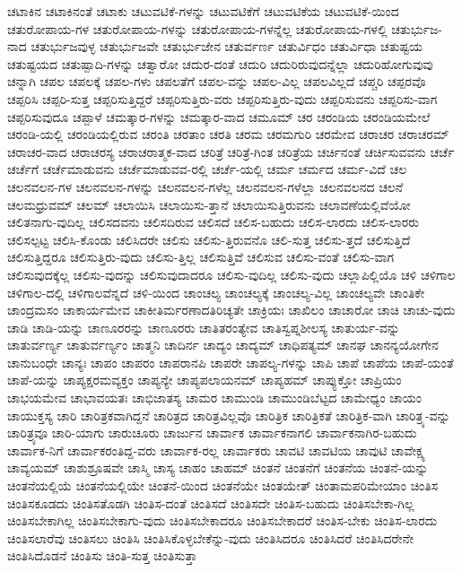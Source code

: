 {ಚಟಾಕಿನ
ಚಟಾಕಿನಂತೆ
ಚಟಾಕು
ಚಟುವಟಿಕೆ-ಗಳನ್ನು
ಚಟುವಟಿಕೆಗೆ
ಚಟುವಟಿಕೆಯ
ಚಟುವಟಿಕೆ-ಯಿಂದ
ಚತುರೋಪಾಯ-ಗಳ
ಚತುರೋಪಾಯ-ಗಳನ್ನು
ಚತುರೋಪಾಯ-ಗಳನ್ನೆಲ್ಲ
ಚತುರೋಪಾಯ-ಗಳಲ್ಲಿ
ಚತುರ್ಭುಜ-ನಾದ
ಚತುರ್ಭುಜವುಳ್ಳ
ಚತುರ್ಭುಜವೇ
ಚತುರ್ಭುಜೇನ
ಚತುರ್ವರ್ಣ
ಚತುರ್ವಿಧಂ
ಚತುರ್ವಿಧಾ
ಚತುಷ್ಟಯ
ಚತುಷ್ಟಯದ
ಚತುಷ್ಪಾದಿ-ಗಳನ್ನು
ಚತ್ವಾರೋ
ಚದುರ-ದಂತೆ
ಚದುರಿ
ಚದುರಿರುವುದನ್ನೆಲ್ಲಾ
ಚದುರಿಹೋಗುವುವು
ಚನ್ನಾಗಿ
ಚಪಲ
ಚಪಲಕ್ಕೆ
ಚಪಲ-ಗಳು
ಚಪಲತೆಗೆ
ಚಪಲ-ವನ್ನು
ಚಪಲ-ವಿಲ್ಲ
ಚಪಲವಿಲ್ಲದೆ
ಚಪ್ಚರಿ
ಚಪ್ಪರವೊ
ಚಪ್ಪರಿಸಿ
ಚಪ್ಪರಿ-ಸುತ್ತ
ಚಪ್ಪರಿಸುತ್ತಿದ್ದರೆ
ಚಪ್ಪರಿಸುತ್ತಿರು-ವರು
ಚಪ್ಪರಿಸುತ್ತಿರು-ವುದು
ಚಪ್ಪರಿಸುವನು
ಚಪ್ಪರಿಸು-ವಾಗ
ಚಪ್ಪರಿಸುವುದೂ
ಚಪ್ಪಾಳೆ
ಚಮತ್ಕಾರ-ಗಳನ್ನು
ಚಮತ್ಕಾರ-ವಾದ
ಚಮೂಮ್
ಚರ
ಚರಂಡಿಯ
ಚರಂಡಿಯಮೇಲೆ
ಚರಂಡಿ-ಯಲ್ಲಿ
ಚರಂಡಿಯಲ್ಲಿರುವ
ಚರಂತಿ
ಚರತಾಂ
ಚರತಿ
ಚರಮ
ಚರಮಗುರಿ
ಚರಮೇವ
ಚರಾಚರ
ಚರಾಚರಮ್
ಚರಾಚರ-ವಾದ
ಚರಾಚರಸ್ಯ
ಚರಾಚರಾತ್ಮಕ-ವಾದ
ಚರಿತ್ರೆ
ಚರಿತ್ರೆ-ಗಿಂತ
ಚರಿತ್ರೆಯ
ಚರ್ಚಿನಂತೆ
ಚರ್ಚಿಸುವವನು
ಚರ್ಚೆ
ಚರ್ಚೆಗೆ
ಚರ್ಚೆಮಾಡುವನು
ಚರ್ಚೆಮಾಡುವವ-ರಲ್ಲಿ
ಚರ್ಚೆ-ಯಲ್ಲಿ
ಚರ್ಮ
ಚರ್ಮದ
ಚರ್ಮ-ವಿದೆ
ಚಲ
ಚಲನವಲನ-ಗಳ
ಚಲನವಲನ-ಗಳನ್ನು
ಚಲನವಲನ-ಗಳೆಲ್ಲ
ಚಲನವಲನ-ಗಳೆಲ್ಲಾ
ಚಲನವಲನದ
ಚಲನೆ
ಚಲಮಧ್ರುವಮ್
ಚಲಮ್
ಚಲಾಯಿಸಿ
ಚಲಾಯಿಸು-ತ್ತಾನೆ
ಚಲಾಯಿಸುತ್ತಿರುವನು
ಚಲಾವಣೆಯಲ್ಲಿವೆಯೋ
ಚಲಿತನಾಗು-ವುದಿಲ್ಲ
ಚಲಿಸದವನು
ಚಲಿಸದಿರುವ
ಚಲಿಸದೆ
ಚಲಿಸ-ಬಹುದು
ಚಲಿಸ-ಲಾರದು
ಚಲಿಸ-ಲಾರರು
ಚಲಿಸಲ್ಪಟ್ಟ
ಚಲಿಸಿ-ಕೊಂಡು
ಚಲಿಸಿದರೇ
ಚಲಿಸು
ಚಲಿಸು-ತ್ತಿರುವನೊ
ಚಲಿ-ಸುತ್ತ
ಚಲಿಸು-ತ್ತದೆ
ಚಲಿಸುತ್ತಿದೆ
ಚಲಿಸುತ್ತಿದ್ದರೂ
ಚಲಿಸುತ್ತಿರು-ವುದು
ಚಲಿಸು-ತ್ತಿಲ್ಲ
ಚಲಿಸುತ್ತಿವೆ
ಚಲಿಸುವ
ಚಲಿಸು-ವಂತೆ
ಚಲಿಸು-ವಾಗ
ಚಲಿಸುವುದಕ್ಕೆಲ್ಲ
ಚಲಿಸು-ವುದನ್ನು
ಚಲಿಸುವುದಾದರೂ
ಚಲಿಸು-ವುದಿಲ್ಲ
ಚಲಿಸು-ವುದು
ಚಲ್ಲಾಪಿಲ್ಲಿಯೊ
ಚಳಿ
ಚಳಿಗಾಲ
ಚಳಿಗಾಲ-ದಲ್ಲಿ
ಚಳಿಗಾಲವೆನ್ನದೆ
ಚಳಿ-ಯಿಂದ
ಚಾಂಚಲ್ಯ
ಚಾಂಚಲ್ಯಕ್ಕೆ
ಚಾಂಚಲ್ಯ-ವಿಲ್ಲ
ಚಾಂಚಲ್ಯವೇ
ಚಾಂತಿಕೇ
ಚಾಂದ್ರಮಸಂ
ಚಾಕಾರ್ಯಮೇವ
ಚಾಕೀತಿರ್ಮರಣಾದತಿರಿಚ್ಯತೇ
ಚಾಕ್ರಿಯಃ
ಚಾಖಿಲಂ
ಚಾಚಾರೋ
ಚಾಚಿ
ಚಾಚು-ವುದು
ಚಾಡಿ
ಚಾಡಿ-ಯನ್ನು
ಚಾಣೂರರನ್ನು
ಚಾಣೂರರು
ಚಾತಿತರಂತ್ಯೇವ
ಚಾತಿಸ್ವಪ್ನಶೀಲಸ್ಯ
ಚಾತುರ್ಯ-ವನ್ನು
ಚಾತುರ್ವರ್ಣ್ಯ
ಚಾತುರ್ವರ್ಣ್ಯಂ
ಚಾತ್ಮನಿ
ಚಾದಿರ್ನ
ಚಾದ್ಯಂ
ಚಾದ್ಯಮ್
ಚಾಧಿಪತ್ಯಮ್
ಚಾನಘ
ಚಾನನ್ಯಯೋಗೇನ
ಚಾನುಬಂಧೇ
ಚಾನ್ಯಃ
ಚಾಪಂ
ಚಾಪರಂ
ಚಾಪರಾನಪಿ
ಚಾಪರೇ
ಚಾಪಲ್ಯ-ಗಳನ್ನು
ಚಾಪಿ
ಚಾಪೆ
ಚಾಪೆಯ
ಚಾಪೆ-ಯಂತೆ
ಚಾಪೆ-ಯನ್ನು
ಚಾಪ್ಯಕ್ಷರಮವ್ಯಕ್ತಂ
ಚಾಪ್ಯನ್ಯೇ
ಚಾಪ್ಯಪಲಾಯನಮ್
ಚಾಪ್ಯಹಮ್
ಚಾಪ್ಯುಕ್ತೋ
ಚಾಪ್ರಿಯಂ
ಚಾಭಯಮೇವ
ಚಾಭಾವಯತಃ
ಚಾಭಿಜಾತಸ್ಯ
ಚಾಮರ
ಚಾಮುಂಡಿ
ಚಾಮುಂಡಿಬೆಟ್ಟದ
ಚಾಮೇಧ್ಯಂ
ಚಾಯಂ
ಚಾಯುಕ್ತಸ್ಯ
ಚಾರಿ
ಚಾರಿತ್ರಕವಾಗಿದ್ದನೆ
ಚಾರಿತ್ರದ
ಚಾರಿತ್ರವಿಲ್ಲವೊ
ಚಾರಿತ್ರಿಕ
ಚಾರಿತ್ರಿಕತೆ
ಚಾರಿತ್ರಿಕ-ವಾಗಿ
ಚಾರಿತ್ರ್ಯ-ವನ್ನು
ಚಾರಿತ್ರ್ಯವೂ
ಚಾರಿ-ಯಾಗು
ಚಾರುಚೂರು
ಚಾರ್ಜುನ
ಚಾರ್ವಾಕ
ಚಾರ್ವಾಕನಾಗಲಿ
ಚಾರ್ವಾಕನಾಗಿರ-ಬಹುದು
ಚಾರ್ವಾಕ-ನಿಗೆ
ಚಾರ್ವಾಕರಂತಿದ್ದ-ವರು
ಚಾರ್ವಾಕ-ರಲ್ಲ
ಚಾರ್ವಾಕರು
ಚಾವಟಿ
ಚಾವಟಿಯ
ಚಾವುಟಿ
ಚಾವೇಕ್ಷ್ಯ
ಚಾವ್ಯಯಮ್
ಚಾಶುಶ್ರೂಷವೇ
ಚಾಸ್ಮಿ
ಚಾಸ್ಯ
ಚಾಹಂ
ಚಾಹಮ್
ಚಿಂತನೆ
ಚಿಂತನೆಗೆ
ಚಿಂತನೆಯ
ಚಿಂತನೆ-ಯನ್ನು
ಚಿಂತನೆಯಲ್ಲಿಯೆ
ಚಿಂತನೆಯಲ್ಲಿಯೇ
ಚಿಂತನೆ-ಯಿಂದ
ಚಿಂತನೆಯೇ
ಚಿಂತಯೇತ್
ಚಿಂತಾಮಪರಿಮೇಯಾಂ
ಚಿಂತಿಸ
ಚಿಂತಿಸಕೂಡದು
ಚಿಂತಿಸತೊಡಗಿ
ಚಿಂತಿಸ-ದಂತೆ
ಚಿಂತಿಸದೆ
ಚಿಂತಿಸದೇ
ಚಿಂತಿಸ-ಬಹುದು
ಚಿಂತಿಸಬೇಕಾ-ಗಿಲ್ಲ
ಚಿಂತಿಸಬೇಕಾಗಿಲ್ಲ
ಚಿಂತಿಸಬೇಕಾಗು-ವುದು
ಚಿಂತಿಸಬೇಕಾದರೂ
ಚಿಂತಿಸಬೇಕಾದರೆ
ಚಿಂತಿಸ-ಬೇಕು
ಚಿಂತಿಸ-ಲಾರದು
ಚಿಂತಿಸಲಾರೆವು
ಚಿಂತಿಸಲು
ಚಿಂತಿಸಿ
ಚಿಂತಿಸಿಕೊಳ್ಳಬೇಕೆನ್ನು-ವುದು
ಚಿಂತಿಸಿದರೂ
ಚಿಂತಿಸಿದರೆ
ಚಿಂತಿಸಿದರೇನೇ
ಚಿಂತಿಸಿದೊಡನೆ
ಚಿಂತಿಸು
ಚಿಂತಿ-ಸುತ್ತ
ಚಿಂತಿಸುತ್ತಾ
}
